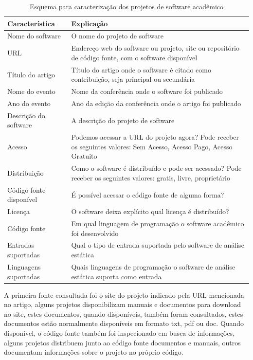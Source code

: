 \begin{table}[h]
\caption{Esquema para caracterização dos projetos de software acadêmico}
\centering
\begin{tabular}{ l p{11cm} }
  \hline
  Característica           & Explicação \\
  \hline
  Nome do software         & O nome do projeto de software \\
  URL                      & Endereço web do software ou projeto, site ou repositório de código fonte, com o software disponível \\
  Título do artigo         & Título do artigo onde o software é citado como contribuição, seja principal ou secundária \\
  Nome do evento           & Nome da conferência onde o software foi publicado \\
  Ano do evento            & Ano da edição da conferência onde o artigo foi publicado \\
  Descrição do software    & A descrição do projeto de software \\
  Acesso                   & Podemos acessar a URL do projeto agora? Pode receber os seguintes valores: Sem Acesso, Acesso Pago, Acesso Gratuito \\
  Distribuição             & Como o software é distribuído e pode ser acessado? Pode receber os seguintes valores: gratis, livre, proprietário \\
  Código fonte disponível  & É possível acessar o código fonte de alguma forma? \\
  Licença                  & O software deixa explícito qual licença é distribuído? \\
  Código fonte             & Em qual linguagem de programação o software acadêmico foi desenvolvido \\
  Entradas suportadas      & Qual o tipo de entrada suportada pelo software de análise estática \\
  Linguagens suportadas    & Quais linguagens de programação o software de análise estática suporta como entrada \\
  \hline
\end{tabular}
\label{esquema-caracteristicas}
\end{table}

A primeira fonte consultada foi o site do projeto indicado pela URL mencionada
no artigo, alguns projetos disponibilizam manuais e documentos para download no
site, estes documentos, quando disponíveis, também foram consultados, estes
documentos estão normalmente disponíveis em formato txt, pdf ou doc.
Quando disponível, o código fonte também foi inspecionado em busca de
informações, alguns projetos distribuem junto ao código fonte documentos e
manuais, outros documentam informações sobre o projeto no próprio código.

